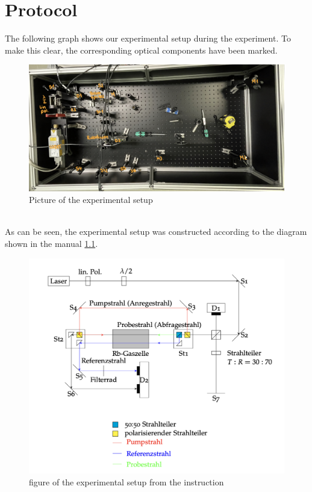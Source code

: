 \chapter{Protocol}
The following graph shows our experimental setup during the experiment.
To make this clear, the corresponding optical components have been marked.\\
\begin{figure}[h]
    \centering
    \includegraphics[scale=0.2]{Bilder/Versuch/Aufbau.jpg}
    \caption{Picture of the experimental setup}
   \end{figure}\\
As can be seen, the experimental setup
was constructed according to the diagram shown in the manual \ref{fig:anleitung}.\\
\begin{figure}[h]
    \centering
    \includegraphics[scale=0.3]{Bilder/Versuch/Abbildung3.png}
    \caption{figure of the experimental setup from the instruction}
    \label{fig:anleitung}
   \end{figure}\\
